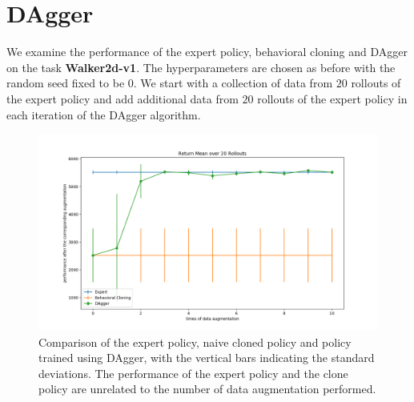 \documentclass[a4paper]{article}
\theoremstyle{definition}
\begin{document}
\section{DAgger}

We examine the performance of the expert policy, behavioral cloning and DAgger on the task \textbf{Walker2d-v1}. The hyperparameters are chosen as before with the random seed fixed to be $0$. We start with a collection of data from $20$ rollouts of the expert policy and add additional data from $20$ rollouts of the expert policy in each iteration of the DAgger algorithm. 

\begin{figure}[H]
\includegraphics[width=\textwidth]{DAgger.png}
\caption{Comparison of the expert policy, naive cloned policy and policy trained using DAgger, with the vertical bars indicating the standard deviations. The performance of the expert policy and the clone policy are unrelated to the number of data augmentation performed.}
\end{figure}
\end{document}
